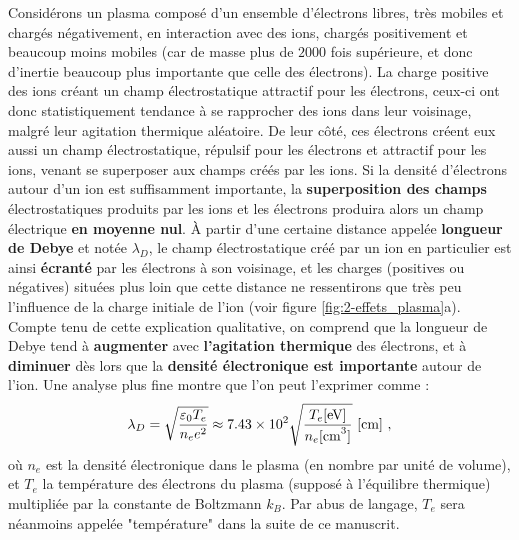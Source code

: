 \begin{refsection}
Considérons un plasma composé d'un ensemble d'électrons libres, très mobiles et chargés négativement, en interaction avec des ions, chargés positivement et beaucoup moins mobiles (car de masse plus de $2000$ fois supérieure, et donc d'inertie beaucoup plus importante que celle des électrons). 
La charge positive des ions créant un champ électrostatique attractif pour les électrons, ceux-ci ont donc statistiquement tendance à se rapprocher des ions dans leur voisinage, malgré leur agitation thermique aléatoire.
De leur côté, ces électrons créent eux aussi un champ électrostatique, répulsif pour les électrons et attractif pour les ions, venant se superposer aux champs créés par les ions. 
Si la densité d'électrons autour d'un ion est suffisamment importante, la \textbf{superposition des champs} électrostatiques produits par les ions et les électrons produira alors un champ électrique \textbf{en moyenne nul}.  
À partir d'une certaine distance appelée \textbf{longueur de Debye} et notée $\lambda_D$, le champ électrostatique créé par un ion en particulier est ainsi \textbf{écranté} par les électrons à son voisinage, et les charges (positives ou négatives) situées plus loin que cette distance ne ressentirons que très peu l'influence de la charge initiale de l'ion (voir figure \ref{fig:2-effets_plasma}a). 
Compte tenu de cette explication qualitative, on comprend que la longueur de Debye tend à \textbf{augmenter} avec \textbf{l'agitation thermique} des électrons, et à \textbf{diminuer} dès lors que la \textbf{densité électronique est importante} autour de l'ion. Une analyse plus fine montre que l'on peut l'exprimer comme \parencite{rax_2007, nrl} :
\begin{equation}
    \lambda_D = \sqrt{\dfrac{\varepsilon_0 T_e}{n_e e^2}} \approx 7.43 \times 10^2 \sqrt{\dfrac{T_e\si{[\eV]}}{n_e \si{[\cm^3]}}} ~ \si{[\cm]} ~ \rm ,
\end{equation}
où $n_e$ est la densité électronique dans le plasma (en nombre par unité de volume), et $T_e$ la température des électrons du plasma (supposé à l'équilibre thermique) multipliée par la constante de Boltzmann $k_B$. Par abus de langage, $T_e$ sera néanmoins appelée "température" dans la suite de ce manuscrit.


\end{refsection}
